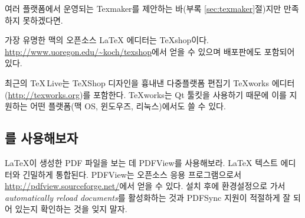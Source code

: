 여러 플랫폼에서 운영되는 Texmaker를 제안하는 바(부록 \ref{sec:texmaker}절)지만 만족하지 못하겠다면\hdots\hdots.

가장 유명한 맥의 오픈소스 \LaTeX{} 에디터는 \TeX{}shop이다.
\url{http://www.uoregon.edu/~koch/texshop}에서 얻을 수 있으며  배포판에도 포함되어 있다.

최근의 \TeX\,Live는 \TeX{}Shop 디자인을 흉내낸 다중플랫폼 편집기 \TeX{}works 에디터(\url{http://texworks.org})를 
포함한다. \TeX{}works는 Qt 툴킷을 사용하기 때문에 이를 지원하는 어떤 플랫폼(맥 OS, 윈도우즈, 리눅스)에서도 
쓸 수 있다.

\subsection{를 사용해보자}

\LaTeX 이 생성한 PDF 파일을 보는 데 PDFView를 사용해보라. 
\LaTeX{} 텍스트 에디터와 긴밀하게 통합된다. PDFView는 오픈소스 응용 프로그램으로서 \url{http://pdfview.sourceforge.net/}에서 얻을 수 있다.
설치 후에 환경설정으로 가서 \emph{automatically reload documents}를 활성화하는 것과
PDFSync 지원이 적절하게 잘 되어 있는지 확인하는 것을 잊지 말자.

